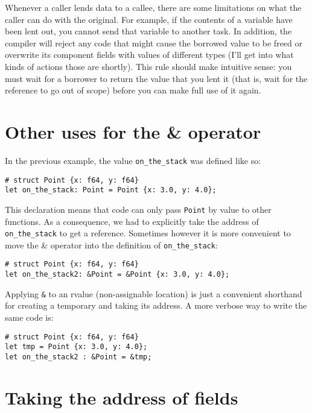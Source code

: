 \documentclass[]{article}
\begin{document}
Whenever a caller lends data to a callee, there are some limitations on
what the caller can do with the original. For example, if the contents
of a variable have been lent out, you cannot send that variable to
another task. In addition, the compiler will reject any code that might
cause the borrowed value to be freed or overwrite its component fields
with values of different types (I'll get into what kinds of actions
those are shortly). This rule should make intuitive sense: you must wait
for a borrower to return the value that you lent it (that is, wait for
the reference to go out of scope) before you can make full use of it
again.

\section{Other uses for the \&
operator}\label{other-uses-for-the-operator}

In the previous example, the value \texttt{on\_the\_stack} was defined
like so:

\begin{verbatim}
# struct Point {x: f64, y: f64}
let on_the_stack: Point = Point {x: 3.0, y: 4.0};
\end{verbatim}

This declaration means that code can only pass \texttt{Point} by value
to other functions. As a consequence, we had to explicitly take the
address of \texttt{on\_the\_stack} to get a reference. Sometimes however
it is more convenient to move the \& operator into the definition of
\texttt{on\_the\_stack}:

\begin{verbatim}
# struct Point {x: f64, y: f64}
let on_the_stack2: &Point = &Point {x: 3.0, y: 4.0};
\end{verbatim}

Applying \texttt{\&} to an rvalue (non-assignable location) is just a
convenient shorthand for creating a temporary and taking its address. A
more verbose way to write the same code is:

\begin{verbatim}
# struct Point {x: f64, y: f64}
let tmp = Point {x: 3.0, y: 4.0};
let on_the_stack2 : &Point = &tmp;
\end{verbatim}

\section{Taking the address of
fields}\label{taking-the-address-of-fields}
\end{document}
